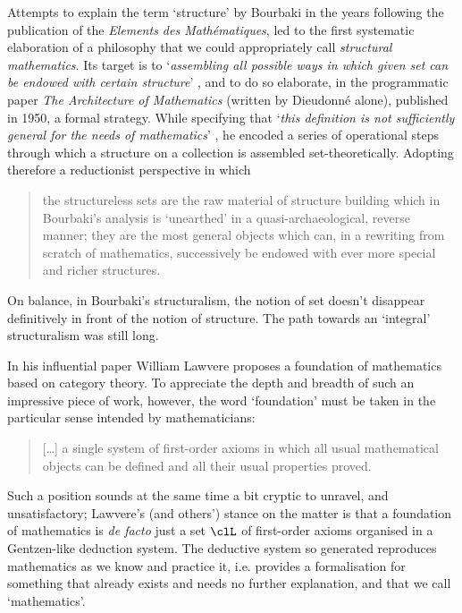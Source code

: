 Attempts to explain the term `structure' by Bourbaki in the years following the publication of the \textit{Elements des Mathématiques}, led to the first systematic elaboration of a philosophy that we could appropriately call \textit{structural mathematics}. Its target is to `\textit{assembling all possible ways in which given set can be endowed with certain structure}' \cite{kromer2007tool}, and to do so elaborate, in the programmatic paper \textit{The Architecture of Mathematics} (written by Dieudonné alone), published in 1950, a formal strategy. While specifying that `\textit{this definition is not sufficiently general for the needs of mathematics}' \cite{Bourb50}, he encoded a series of operational steps through which a structure on a collection is assembled set-theoretically. Adopting therefore a reductionist perspective in which
\begin{quote}
    the structureless sets are the raw material of structure building which in Bourbaki’s analysis is `unearthed' in a quasi-archaeological, reverse manner; they are the most general objects which can, in a rewriting from scratch of mathematics, successively be endowed with ever more special and richer structures.\hfill  \cite{kromer2007tool}
\end{quote}
On balance, in Bourbaki's structuralism, the notion of set doesn't disappear definitively in front of the notion of structure. The path towards an `integral' structuralism was still long.

In his influential paper \cite{lajolla} William Lawvere proposes a foundation of mathematics based on category theory. To appreciate the depth and breadth of such an impressive piece of work, however, the word `foundation' must be taken in the particular sense intended by mathematicians:
\begin{quote}
    [\dots\unkern] a single system of first-order axioms in which all usual mathematical objects can be defined and all their usual properties proved.
\end{quote}
Such a position sounds at the same time a bit cryptic to unravel, and unsatisfactory; Lawvere's (and others') stance on the matter is that a foundation of mathematics is \emph{de facto} just a set $\clL$ of first-order axioms organised in a Gentzen-like deduction system. The deductive system so generated reproduces mathematics as we know and practice it, i.e. provides a formalisation for something that already exists and needs no further explanation, and that we call `mathematics'.

